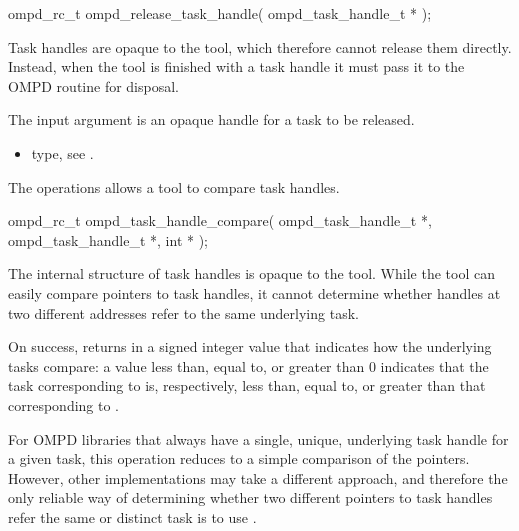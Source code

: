 \format

\cspecificstart
\begin{ompSyntax}
ompd_rc_t ompd_release_task_handle(
  ompd_task_handle_t *
);
\end{ompSyntax}
\cspecificend


\descr
Task handles are opaque to the tool, which therefore cannot release
them directly. Instead, when the tool is finished with a task handle it must
pass it to the OMPD  routine
for disposal.

\argdesc
The input argument  is an opaque handle for a task
to be released.

\crossreferences
\begin{itemize}
	\item {} type, see .
\end{itemize}


\label{ompd:ompd_task_handle_compare}
\summary
The  operations allows a tool to compare task 
handles.

\format

\cspecificstart
\begin{ompSyntax}
ompd_rc_t ompd_task_handle_compare(
  ompd_task_handle_t *,
  ompd_task_handle_t *,
  int *
);
\end{ompSyntax}
\cspecificend


\descr
The internal structure of task handles is opaque to the tool. While the tool can easily compare 
pointers to task handles, it cannot determine whether handles at two different addresses refer
to the same underlying task.

On success,  returns in  a signed integer 
value that indicates how the underlying tasks compare: a value less than, equal to, or greater than 
0 indicates that the task corresponding to  is, respectively, less than, equal 
to, or greater than that corresponding to .

For OMPD libraries that always have a single, unique, underlying task handle for a given 
task, this operation reduces to a simple comparison of the pointers. However, other 
implementations may take a different approach, and therefore the only reliable way of determining 
whether two different pointers to task handles refer the same or distinct task is to use 
.

